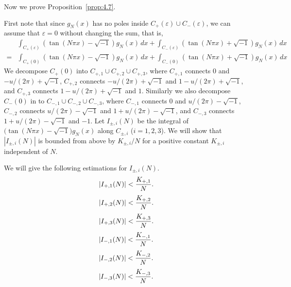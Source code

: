 \documentclass[a4paper]{amsart}
\theoremstyle{plain}
\theoremstyle{definition}
\theoremstyle{remark}
\numberwithin{equation}{section}
\begin{document}
Now we prove Proposition~\ref{prop:4.7}.
\par
First note that since $g_N(x)$ has no poles inside $C_{+}(\varepsilon)\cup C_{-}(\varepsilon)$, we can assume that $\varepsilon=0$ without changing the sum, that is,
\begin{equation*}
\begin{split}
  &\int_{C_{+}(\varepsilon)}(\tan(N\pi x)-\sqrt{-1})g_N(x)\,dx
  +
  \int_{C_{-}(\varepsilon)}(\tan(N\pi x)+\sqrt{-1})g_N(x)\,dx
  \\
  =&
  \int_{C_{+}(0)}(\tan(N\pi x)-\sqrt{-1})g_N(x)\,dx
  +
  \int_{C_{-}(0)}(\tan(N\pi x)+\sqrt{-1})g_N(x)\,dx
\end{split}
\end{equation*}
We decompose $C_{+}(0)$ into $C_{+,1}\cup C_{+,2}\cup C_{+,3}$, where $C_{+,1}$ connects $0$ and $-u/(2\pi)+\sqrt{-1}$, $C_{+,2}$ connects $-u/(2\pi)+\sqrt{-1}$ and $1-u/(2\pi)+\sqrt{-1}$, and $C_{+,3}$ connects $1-u/(2\pi)+\sqrt{-1}$ and $1$.
Similarly we also decompose $C_{-}(0)$ in to $C_{-,1}\cup C_{-,2}\cup C_{-,3}$, where $C_{-,1}$ connects $0$ and $u/(2\pi)-\sqrt{-1}$, $C_{-,2}$ connects $u/(2\pi)-\sqrt{-1}$ and $1+u/(2\pi)-\sqrt{-1}$, and $C_{-,3}$ connects $1+u/(2\pi)-\sqrt{-1}$ and $-1$.
Let $I_{\pm,i}(N)$ be the integral of $\bigl(\tan(N\pi x)-\sqrt{-1}\bigr)g_N(x)$ along $C_{\pm,i}$ ($i=1,2,3$).
We will show that $|I_{\pm,i}(N)|$ is bounded from above by $K_{\pm,i}/N$ for a positive constant $K_{\pm,i}$ independent of $N$.
\par
We will give the following estimations for $I_{\pm,i}(N)$.
\begin{equation}\label{eq:I_{+,1}}
  |I_{+,1}(N)|<\frac{K_{+,1}}{N}.
\end{equation}
\begin{equation}\label{eq:I_{+,2}}
  |I_{+,2}(N)|<\frac{K_{+,2}}{N}.
\end{equation}
\begin{equation}\label{eq:I_{+,3}}
  |I_{+,3}(N)|<\frac{K_{+,3}}{N}.
\end{equation}
\begin{equation}\label{eq:I_{-,1}}
  |I_{-,1}(N)|<\frac{K_{-,1}}{N}.
\end{equation}
\begin{equation}\label{eq:I_{-,2}}
  |I_{-,2}(N)|<\frac{K_{-,2}}{N}.
\end{equation}
\begin{equation}\label{eq:I_{-,3}}
  |I_{-,3}(N)|<\frac{K_{-,3}}{N}.
\end{equation}
\end{document}
